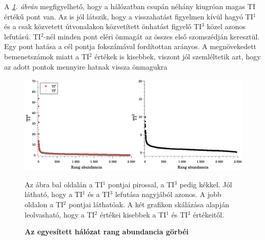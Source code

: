 \documentclass[a4paper,12pt]{article}
\newenvironment{imgdesc}{
		\small
		\singlespacing
		\begin{center}
		
	}{
		\end{center}	
	}
\begin{document}
			A \textit{\ref{fig:mergedTIs}. ábrán} megfigyelhető, hogy a hálózatban csupán néhány kiugróan magas TI értékű pont van. Az is jól látszik, hogy a visszahatást figyelmen kívül hagyó TI$^1$ és a csak közvetett útvonalakon közvetített önhatást figyelő TI$^3$ közel azonos lefutású. TI$^2$-nél minden pont eléri önmagát az összes első szomszédján keresztül. Egy pont hatása a cél pontja fokszámával fordítottan arányos. A megnövekedett bemenetszámok miatt a TI$^2$ értékek is kisebbek, viszont jól szemléltetik azt, hogy az adott pontok mennyire hatnak vissza önmagukra			
			
			\begin{figure}[H]
				\includegraphics[scale=0.5]{img/mergedTIs.pdf}
				\centering
				\caption{\textbf{ Az egyesített hálózat rang abundancia görbéi}}
				\begin{imgdesc}
					Az ábra bal oldalán a TI$^1$ pontjai pirossal, a TI$^3$ pedig kékkel. Jól látható, hogy a TI$^1$ és a TI$^3$ lefutása nagyjából azonos. A jobb oldalon a TI$^2$ pontjai láthatóak. A két grafikon skálázása alapján leolvasható, hogy a TI$^2$ értékei kisebbek a TI$^1$ és TI$^3$ értékeitől.
				\end{imgdesc}
	
				\label{fig:mergedTIs}			 		 
			\end{figure}
\end{document}
